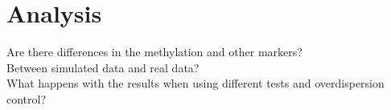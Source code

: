 \section{Analysis}

Are there differences in the methylation and other markers?\\
Between simulated data and real data?\\
What happens with the results when using different tests and overdispersion control?
  
  
  